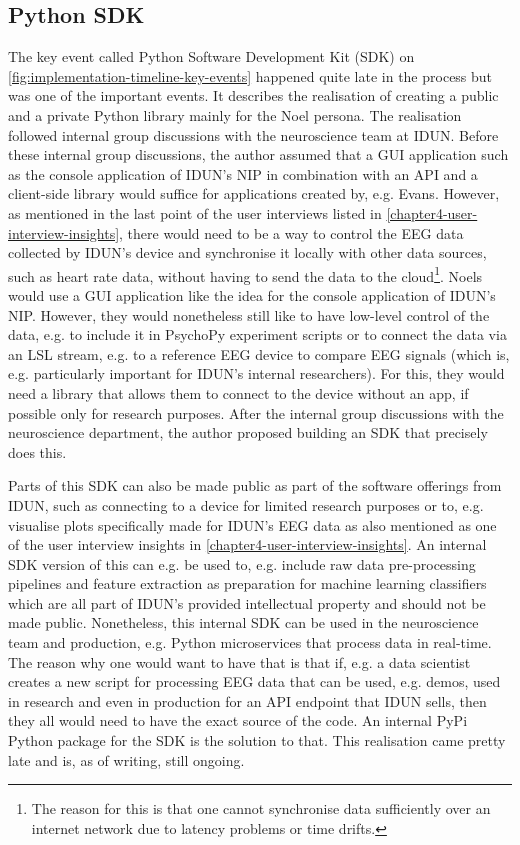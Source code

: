 \subsection{Python SDK}
\label{chapter4-python-sdk}

The key event called Python Software Development Kit (SDK) on \autoref{fig:implementation-timeline-key-events} happened quite late in the process but was one of the important events. It describes the realisation of creating a public and a private Python library mainly for the Noel persona. The realisation followed internal group discussions with the neuroscience team at IDUN. Before these internal group discussions, the author assumed that a GUI application such as the console application of IDUN's NIP in combination with an API and a client-side library would suffice for applications created by, e.g. Evans. However, as mentioned in the last point of the user interviews listed in \autoref{chapter4-user-interview-insights}, there would need to be a way to control the EEG data collected by IDUN's device and synchronise it locally with other data sources, such as heart rate data, without having to send the data to the cloud\footnote{The reason for this is that one cannot synchronise data sufficiently over an internet network due to latency problems or time drifts.}. Noels would use a GUI application like the idea for the console application of IDUN's NIP. However, they would nonetheless still like to have low-level control of the data, e.g. to include it in PsychoPy experiment scripts or to connect the data via an LSL stream, e.g. to a reference EEG device to compare EEG signals (which is, e.g. particularly important for IDUN's internal researchers). For this, they would need a library that allows them to connect to the device without an app, if possible only for research purposes. After the internal group discussions with the neuroscience department, the author proposed building an SDK that precisely does this.

Parts of this SDK can also be made public as part of the software offerings from IDUN, such as connecting to a device for limited research purposes or to, e.g. visualise plots specifically made for IDUN's EEG data as also mentioned as one of the user interview insights in \autoref{chapter4-user-interview-insights}. An internal SDK version of this can e.g. be used to, e.g. include raw data pre-processing pipelines and feature extraction as preparation for machine learning classifiers which are all part of IDUN's provided intellectual property and should not be made public. Nonetheless, this internal SDK can be used in the neuroscience team and production, e.g. Python microservices that process data in real-time. The reason why one would want to have that is that if, e.g. a data scientist creates a new script for processing EEG data that can be used, e.g. demos, used in research and even in production for an API endpoint that IDUN sells, then they all would need to have the exact source of the code. An internal PyPi Python package for the SDK is the solution to that. This realisation came pretty late and is, as of writing, still ongoing.

